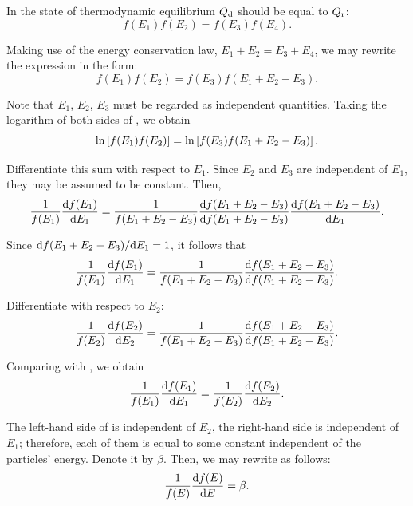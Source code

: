 \noindent
In the state of thermodynamic equilibrium $Q_{\text{d}}$ should be equal to $Q_{\text{r}}$:
\begin{equation}\label{eq:A_3}
    f(E_1) f(E_2) = f(E_3) f(E_4).
\end{equation}

\noindent
Making use of the energy conservation law, $E_1+E_2=E_3+E_4$, we may rewrite the expression in the form:
\begin{equation}\label{eq:A_4}
    f(E_1) f(E_2) = f(E_3) f(E_1 + E_2 - E_3).
\end{equation}

\noindent
Note that $E_1$, $E_2$, $E_3$ must be regarded as independent quantities. Taking the logarithm of both sides of , we obtain
\begin{equation}\label{eq:A_5}
    \ln\left[f(E_1) f(E_2)\right] = \ln\left[f(E_3) f(E_1 + E_2 - E_3)\right].
\end{equation}

Differentiate this sum with respect to $E_1$. Since $E_2$ and $E_3$ are independent of $E_1$, they may be assumed to be constant. Then,
\begin{equation}\label{eq:A_6}
    \frac{1}{f(E_1)} \dfrac{\mathrm{d} f(E_1)}{\mathrm{d} E_1} = \frac{1}{f(E_1 + E_2 - E_3)} \dfrac{\mathrm{d} f(E_1 + E_2 - E_3)}{\mathrm{d} f(E_1 + E_2 - E_3)} \dfrac{\mathrm{d} f(E_1 + E_2 - E_3)}{\mathrm{d} E_1}.
\end{equation}

Since $\mathrm{d} f(E_1+E_2-E_3)/\mathrm{d} E_1=1$, it follows that
\begin{equation}\label{eq:A_7}
    \frac{1}{f(E_1)} \dfrac{\mathrm{d} f(E_1)}{\mathrm{d} E_1} = \frac{1}{f(E_1 + E_2 - E_3)} \dfrac{\mathrm{d} f(E_1 + E_2 - E_3)}{\mathrm{d} f(E_1 + E_2 - E_3)}.
\end{equation}

\noindent
Differentiate  with respect to $E_2$:
\begin{equation}\label{eq:A_8}
    \frac{1}{f(E_2)} \dfrac{\mathrm{d} f(E_2)}{\mathrm{d} E_2} = \frac{1}{f(E_1 + E_2 - E_3)} \dfrac{\mathrm{d} f(E_1 + E_2 - E_3)}{\mathrm{d} f(E_1 + E_2 - E_3)}.
\end{equation}

\noindent
Comparing  with , we obtain
\begin{equation}\label{eq:A_9}
    \frac{1}{f(E_1)} \dfrac{\mathrm{d} f(E_1)}{\mathrm{d} E_1} = \frac{1}{f(E_2)} \dfrac{\mathrm{d} f(E_2)}{\mathrm{d} E_2}.
\end{equation}

The left-hand side of  is independent of $E_2$, the right-hand side is independent of $E_1$; therefore, each of them is equal to some constant independent of the particles' energy. Denote it by $\beta$. Then, we may rewrite  as follows:
\begin{equation}\label{eq:A_10}
    \frac{1}{f(E)} \dfrac{\mathrm{d} f(E)}{\mathrm{d} E} = \beta.
\end{equation}

